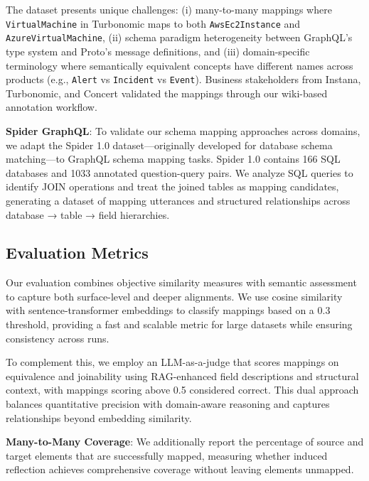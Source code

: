 \documentclass[sigconf, nonacm]{acmart}
\newcommand{\deleted}[1]{\textcolor{red}{#1}}
\begin{document}
The dataset presents unique challenges: (i) many-to-many mappings where \texttt{VirtualMachine} in Turbonomic maps to both \texttt{AwsEc2Instance} and \texttt{AzureVirtualMachine}, (ii) schema paradigm heterogeneity between GraphQL's type system and Proto's message definitions, and (iii) domain-specific terminology where semantically equivalent concepts have different names across products (e.g., \texttt{Alert} vs \texttt{Incident} vs \texttt{Event}). Business stakeholders from Instana, Turbonomic, and Concert validated the mappings through our wiki-based annotation workflow.

\textbf{Spider GraphQL}: To validate our schema mapping approaches across domains, we adapt the Spider 1.0 dataset—originally developed for database schema matching—to GraphQL schema mapping tasks. Spider 1.0 contains 166 SQL databases and 1033 annotated question-query pairs. We analyze SQL queries to identify JOIN operations and treat the joined tables as mapping candidates, generating a dataset of mapping utterances and structured relationships across database → table → field hierarchies.


\subsection{Evaluation Metrics}

Our evaluation combines objective similarity measures with semantic assessment to capture both surface-level and deeper alignments. We use cosine similarity with sentence-transformer embeddings to classify mappings based on a 0.3 threshold, providing a fast and scalable metric for large datasets while ensuring consistency across runs.

To complement this, we employ an LLM-as-a-judge that scores mappings on equivalence and joinability using RAG-enhanced field descriptions and structural context, with mappings scoring above 0.5 considered correct. This dual approach balances quantitative precision with domain-aware reasoning and captures relationships beyond embedding similarity.

\textbf{Many-to-Many Coverage}: We additionally report the percentage of source and target elements that are successfully mapped, measuring whether induced reflection achieves comprehensive coverage without leaving elements unmapped.
\end{document}
